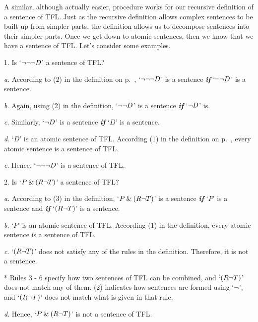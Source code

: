 A similar, although actually easier, procedure works for our recursive definition of a sentence of TFL. Just as the recursive definition allows complex sentences to be built up from simpler parts, the definition allows us to decompose sentences into their simpler parts. Once we get down to atomic sentences, then we know that we have a sentence of TFL. Let's consider some examples.

	\begin{ebullet}
	\item[1.] Is `${\neg} {\neg} {\neg} D$' a sentence of TFL? 
		\begin{ebullet}
		\item[\textit{a}.] According to (2) in the definition on p.~\pageref{TFLsentences}, `${\neg} {\neg} {\neg} D$' is a sentence \textit{\textbf{if}} `${\neg} {\neg} D$' is a sentence. 
		\item[\textit{b}.] Again, using (2) in the definition, `${\neg} {\neg} D$' is a sentence \textit{\textbf{if}} `${\neg} D$' is. 
		\item[\textit{c}.] Similarly, `${\neg} D$' is a sentence \textit{\textbf{if}} `$D$' is a sentence. 
		\item[\textit{d}.] `$D$' is an atomic sentence of TFL. According (1) in the definition on p.~\pageref{TFLsentences}, every atomic sentence is a sentence of TFL. 
		\item[\textit{e}.] Hence, `${\neg} {\neg} {\neg} D$' is a sentence of TFL.
		\end{ebullet}
	
	\item[2.] Is `$P \mathbin{\&} (R {\neg} T)$' a sentence of TFL?
		\begin{ebullet}
		\item[\textit{a}.] According to (3) in the definition, `$P \mathbin{\&} (R {\neg} T)$' is a sentence \textit{\textbf{if}} `$P$' is a sentence and \textit{\textbf{if}} `$(R {\neg} T)$' is a sentence.
		\item[\textit{b}.] `$P$' is an atomic sentence of TFL. According (1) in the definition, every atomic sentence is a sentence of TFL.
		\item[\textit{c}.] `$(R {\neg} T)$' does not satisfy any of the rules in the definition. Therefore, it is not a sentence. 
		\item[*] Rules 3 - 6 specify how two sentences of TFL can be combined, and `$(R {\neg} T)$' does not match any of them. (2) indicates how sentences are formed using `${\neg}$', and `$(R {\neg} T)$' does not match what is given in that rule.
		\item[\textit{d}.] Hence, `$P \mathbin{\&} (R {\neg} T)$' is not a sentence of TFL. 
		\end{ebullet}


\end{ebullet}
